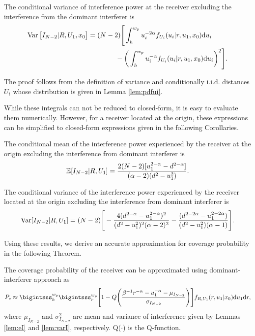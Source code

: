 \documentclass[journal,draftclsnofoot,onecolumn,12pt]{IEEEtran}
\begin{document}
\begin{lemma}\label{lem:varI}
The conditional variance of interference power at the receiver excluding the interference from the dominant interferer is 
\begin{align}\notag
\operatorname{Var}\big[I_{N-2}| R, U_1, x_0 \big] &= (N-2)\Bigg[\int_h^{w_p}u_i^{-2\alpha}f_{U_i}(u_i | r, u_1, x_0)  {\rm d}u_i \\
&\qquad \qquad-  \bigg(\int_h^{w_p}u_i^{-\alpha}f_{U_i}(u_i | r, u_1, x_0)  {\rm d}u_i \bigg)^2 \Bigg].
\end{align}
\end{lemma}
\begin{IEEEproof}
The proof follows from the definition of variance and conditionally i.i.d. distances $U_i$ whose distribution is given in Lemma \ref{lem:pdfui}. %
\end{IEEEproof}
While these integrals can not be reduced to closed-form, it is easy to evaluate them numerically. However, for a receiver located at the origin, these expressions can be simplified to closed-form expressions given in the following Corollaries.
\begin{cor}
The conditional mean of the interference power experienced by the receiver at the origin excluding the interference from dominant interferer is 
\begin{align}
{\mathbb{E}}[I_{N-2}|R, U_1] = \frac{2(N-2)[u_1^{2-\alpha}-d^{2-\alpha}]}{(\alpha-2)(d^2-u_1^2)}. 
\end{align}
\end{cor}
\begin{cor}
The conditional variance of the interference power experienced by the receiver located at the origin excluding the interference from dominant interferer is 
\begin{align}
 \operatorname{Var}[I_{N-2} | R, U_1] = (N-2)\Bigg[- \frac{4(d^{2 - \alpha} - u_1^{2 - \alpha})^2}{(d^2 - u_1^2)^2(\alpha - 2)^2} - \frac{(d^{2 - 2\alpha} - u_1^{2 - 2\alpha})}{(d^2 - u_1^2)(\alpha - 1)}\Bigg].
\end{align}
\end{cor}
Using these results, we derive an accurate approximation for coverage probability in the following Theorem.
\begin{thm}\label{thm:clt} 
The coverage probability of the receiver can be approximated using dominant-interferer approach as
\begin{align}\notag
P_c \approx \bigintsss_h^{w_p} \bigintsss_{r}^{w_p} \Bigg[ 1 - Q\Bigg( \frac{\beta^{-1} r^{-\alpha} - u_1^{-\alpha} - \mu_{I_{N-2}}}{\sigma_{I_{N-2}}} \Bigg) \Bigg] f_{R,U_1}(r,u_1 | x_0) {\rm d}u_1 {\rm d}r,
\end{align}
where $\mu_{I_{N-2}}$ and $\sigma_{I_{N-2}}^2$ are mean and variance of interference given by Lemmas \ref{lem:eI} and \ref{lem:varI}, respectively. Q($\cdot$) is the Q-function.
\end{thm}
\end{document}
